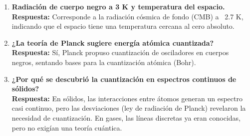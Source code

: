 \documentclass{article}
\begin{document}
\begin{enumerate}[leftmargin=*]
\item \textbf{Radiación de cuerpo negro a 3 K y temperatura del espacio.} \\
\textbf{Respuesta:} Corresponde a la radiación cósmica de fondo (CMB) a ~2.7 K, indicando que el espacio tiene una temperatura cercana al cero absoluto.

\item \textbf{¿La teoría de Planck sugiere energía atómica cuantizada?} \\
\textbf{Respuesta:} Sí, Planck propuso cuantización de osciladores en cuerpos negros, sentando bases para la cuantización atómica (Bohr).

\item \textbf{¿Por qué se descubrió la cuantización en espectros continuos de sólidos?} \\
\textbf{Respuesta:} En sólidos, las interacciones entre átomos generan un espectro casi continuo, pero las desviaciones (ley de radiación de Planck) revelaron la necesidad de cuantización. En gases, las líneas discretas ya eran conocidas, pero no exigían una teoría cuántica.
\end{enumerate}
\end{document}
